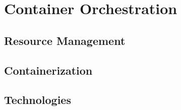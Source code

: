 \chapter{Container Orchestration}
\label{chp:container-orchestration}


\lipsum[1]


\section{Resource Management}
\label{sec:container-orchestration-resource-management}

\lipsum[1]


\section{Containerization}
\label{sec:container-orchestration-containerization}

\lipsum[1]


\section{Technologies}
\label{sec:container-orchestration-technologies}

\lipsum[1]